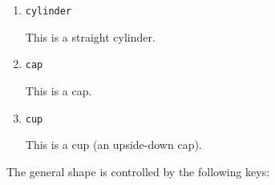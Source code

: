 \documentclass{ltxdoc}
\begin{document}
\begin{enumerate}
\item \Verb+cylinder+

This is a straight cylinder.


\item \Verb+cap+

This is a cap.


\item \Verb+cup+

This is a cup (an upside-down cap).


\end{enumerate}

The general shape is controlled by the following keys:
\end{document}
